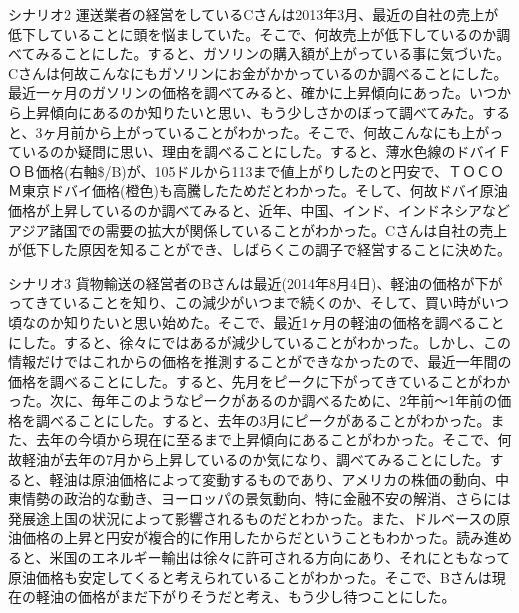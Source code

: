 \documentclass{matsushita-zemi}
\begin{document}
\begin{itembox}[l]{シナリオ2}
運送業者の経営をしているCさんは2013年3月、最近の自社の売上が低下していることに頭を悩ましていた。そこで、何故売上が低下しているのか調べてみることにした。すると、ガソリンの購入額が上がっている事に気づいた。Cさんは何故こんなにもガソリンにお金がかかっているのか調べることにした。最近一ヶ月のガソリンの価格を調べてみると、確かに上昇傾向にあった。いつから上昇傾向にあるのか知りたいと思い、もう少しさかのぼって調べてみた。すると、3ヶ月前から上がっていることがわかった。そこで、何故こんなにも上がっているのか疑問に思い、理由を調べることにした。すると、薄水色線のドバイＦＯＢ価格(右軸\$/B)が、105ドルから113まで値上がりしたのと円安で、ＴＯＣＯＭ東京ドバイ価格(橙色)も高騰したためだとわかった。そして、何故ドバイ原油価格が上昇しているのか調べてみると、近年、中国、インド、インドネシアなどアジア諸国での需要の拡大が関係していることがわかった。Cさんは自社の売上が低下した原因を知ることができ、しばらくこの調子で経営することに決めた。
\end{itembox}

\begin{itembox}[l]{シナリオ3}
貨物輸送の経営者のBさんは最近(2014年8月4日)、軽油の価格が下がってきていることを知り、この減少がいつまで続くのか、そして、買い時がいつ頃なのか知りたいと思い始めた。そこで、最近1ヶ月の軽油の価格を調べることにした。すると、徐々にではあるが減少していることがわかった。しかし、この情報だけではこれからの価格を推測することができなかったので、最近一年間の価格を調べることにした。すると、先月をピークに下がってきていることがわかった。次に、毎年このようなピークがあるのか調べるために、2年前〜1年前の価格を調べることにした。すると、去年の3月にピークがあることがわかった。また、去年の今頃から現在に至るまで上昇傾向にあることがわかった。そこで、何故軽油が去年の7月から上昇しているのか気になり、調べてみることにした。すると、軽油は原油価格によって変動するものであり、アメリカの株価の動向、中東情勢の政治的な動き、ヨーロッパの景気動向、特に金融不安の解消、さらには発展途上国の状況によって影響されるものだとわかった。また、ドルベースの原油価格の上昇と円安が複合的に作用したからだということもわかった。読み進めると、米国のエネルギー輸出は徐々に許可される方向にあり、それにともなって原油価格も安定してくると考えられていることがわかった。そこで、Bさんは現在の軽油の価格がまだ下がりそうだと考え、もう少し待つことにした。
\end{itembox}
\end{document}
